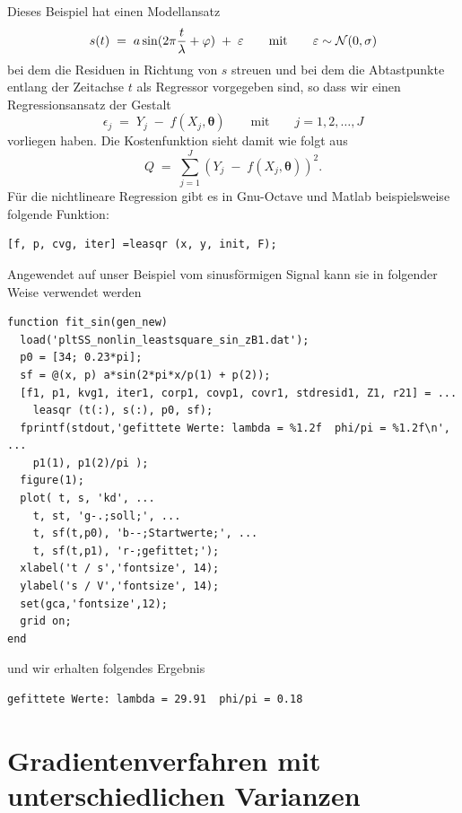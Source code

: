 Dieses Beispiel hat einen Modellansatz
\begin{equation}
s(t) \; = \; a \sin(2\pi \frac{t}{\lambda} + \varphi) \; + \; \varepsilon \qquad 
\textrm{mit} \qquad \varepsilon \sim {\cal N}(0,\sigma) 
\end{equation}
bei dem die Residuen in Richtung von $s$ streuen und bei dem die Abtastpunkte
entlang der Zeitachse $t$ als Regressor vorgegeben sind, so dass
wir einen Regressionsansatz der Gestalt
\begin{equation}
\epsilon_j \; = \; Y_j \; - \; f(X_j, \boldsymbol{\theta}) \qquad \textrm{mit} \qquad 
j=1, 2,\dots, J 
\end{equation}
vorliegen haben. Die Kostenfunktion sieht damit wie folgt aus
\begin{equation}
Q \; = \; \sum\limits_{j=1}^J \left(Y_j \; - \; f(X_j, \boldsymbol{\theta})\right)^2.
\end{equation}
Für die nichtlineare Regression gibt es in Gnu-Octave und Matlab beispielsweise folgende
Funktion:
\begin{verbatim}
[f, p, cvg, iter] =leasqr (x, y, init, F);
\end{verbatim}
Angewendet auf unser Beispiel vom sinusförmigen Signal kann sie in folgender Weise
verwendet werden
\begin{verbatim}
function fit_sin(gen_new)
  load('pltSS_nonlin_leastsquare_sin_zB1.dat');
  p0 = [34; 0.23*pi];
  sf = @(x, p) a*sin(2*pi*x/p(1) + p(2));
  [f1, p1, kvg1, iter1, corp1, covp1, covr1, stdresid1, Z1, r21] = ...
    leasqr (t(:), s(:), p0, sf);
  fprintf(stdout,'gefittete Werte: lambda = %1.2f  phi/pi = %1.2f\n', ...
    p1(1), p1(2)/pi );
  figure(1);
  plot( t, s, 'kd', ...
    t, st, 'g-.;soll;', ...
    t, sf(t,p0), 'b--;Startwerte;', ...
    t, sf(t,p1), 'r-;gefittet;');
  xlabel('t / s','fontsize', 14);
  ylabel('s / V','fontsize', 14);
  set(gca,'fontsize',12);
  grid on;
end
\end{verbatim}
und wir erhalten folgendes Ergebnis
\begin{verbatim}
gefittete Werte: lambda = 29.91  phi/pi = 0.18
\end{verbatim}

\section{Gradientenverfahren mit unterschiedlichen Varianzen}

